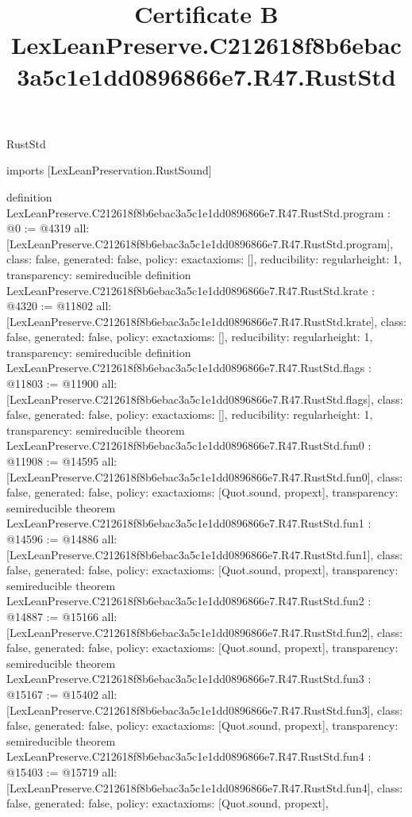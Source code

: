 \begin{lexlean}{RustStd}
\title{Certificate B LexLeanPreserve.C212618f8b6ebac3a5c1e1dd0896866e7.R47.RustStd}
\begin{coremodule}
imports [LexLeanPreservation.RustSound]

definition LexLeanPreserve.C212618f8b6ebac3a5c1e1dd0896866e7.R47.RustStd.program : @0 := @4319 {
  all: [LexLeanPreserve.C212618f8b6ebac3a5c1e1dd0896866e7.R47.RustStd.program],
  class: false,
  generated: false,
  policy: exact{axioms: []},
  reducibility: regular{height: 1},
  transparency: semireducible
}
definition LexLeanPreserve.C212618f8b6ebac3a5c1e1dd0896866e7.R47.RustStd.krate : @4320 := @11802 {
  all: [LexLeanPreserve.C212618f8b6ebac3a5c1e1dd0896866e7.R47.RustStd.krate],
  class: false,
  generated: false,
  policy: exact{axioms: []},
  reducibility: regular{height: 1},
  transparency: semireducible
}
definition LexLeanPreserve.C212618f8b6ebac3a5c1e1dd0896866e7.R47.RustStd.flags : @11803 := @11900 {
  all: [LexLeanPreserve.C212618f8b6ebac3a5c1e1dd0896866e7.R47.RustStd.flags],
  class: false,
  generated: false,
  policy: exact{axioms: []},
  reducibility: regular{height: 1},
  transparency: semireducible
}
theorem LexLeanPreserve.C212618f8b6ebac3a5c1e1dd0896866e7.R47.RustStd.fun0 : @11908 := @14595 {
  all: [LexLeanPreserve.C212618f8b6ebac3a5c1e1dd0896866e7.R47.RustStd.fun0],
  class: false,
  generated: false,
  policy: exact{axioms: [Quot.sound, propext]},
  transparency: semireducible
}
theorem LexLeanPreserve.C212618f8b6ebac3a5c1e1dd0896866e7.R47.RustStd.fun1 : @14596 := @14886 {
  all: [LexLeanPreserve.C212618f8b6ebac3a5c1e1dd0896866e7.R47.RustStd.fun1],
  class: false,
  generated: false,
  policy: exact{axioms: [Quot.sound, propext]},
  transparency: semireducible
}
theorem LexLeanPreserve.C212618f8b6ebac3a5c1e1dd0896866e7.R47.RustStd.fun2 : @14887 := @15166 {
  all: [LexLeanPreserve.C212618f8b6ebac3a5c1e1dd0896866e7.R47.RustStd.fun2],
  class: false,
  generated: false,
  policy: exact{axioms: [Quot.sound, propext]},
  transparency: semireducible
}
theorem LexLeanPreserve.C212618f8b6ebac3a5c1e1dd0896866e7.R47.RustStd.fun3 : @15167 := @15402 {
  all: [LexLeanPreserve.C212618f8b6ebac3a5c1e1dd0896866e7.R47.RustStd.fun3],
  class: false,
  generated: false,
  policy: exact{axioms: [Quot.sound, propext]},
  transparency: semireducible
}
theorem LexLeanPreserve.C212618f8b6ebac3a5c1e1dd0896866e7.R47.RustStd.fun4 : @15403 := @15719 {
  all: [LexLeanPreserve.C212618f8b6ebac3a5c1e1dd0896866e7.R47.RustStd.fun4],
  class: false,
  generated: false,
  policy: exact{axioms: [Quot.sound, propext]},
}
\end{coremodule}
\end{lexlean}
